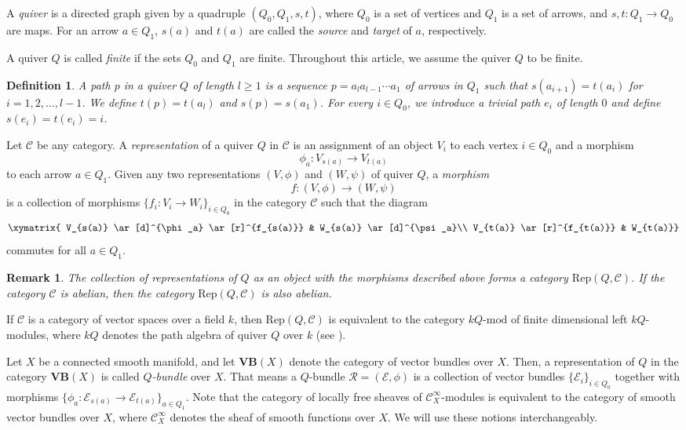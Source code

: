 \documentclass[12pt, reqno]{amsart}
\theoremstyle{plain}
\newtheorem{definition}[theorem]{Definition}
\newtheorem{remark}[theorem]{Remark}
\numberwithin{equation}{section}
\begin{document}
A \emph{quiver} is a directed graph given by a quadruple $(Q_0, Q_1, s, t)$, where $Q_0$ is a set of vertices and $Q_1$ is a set of arrows, and $s,t: Q_1\rightarrow Q_0$ are maps. For an arrow $a\in Q_1$, $s(a)$ and $t(a)$ are called the \emph{source} and \emph{target} of $a$, respectively.
	
	A quiver $Q$ is called \emph{finite} if the sets $Q_0$ and $Q_1$ are finite. Throughout this article, we assume the quiver $Q$ to be finite. 
	\begin{definition}
\rm  A \emph{path} $p$ in a quiver $Q$ of length $l \geq 1$ is a sequence $p=a_{l} a_{l-1}\cdots a_{1}$ of arrows in $Q_{1}$ such that $s(a_{i+1})=t(a_{i})$ for $i=1,2,\ldots,l-1$. We define $t(p)=t(a_{l})$ and $s(p)=s(a_{1})$. For every $i \in Q_{0}$, we introduce a trivial path $e_{i}$ of length $0$ and define $s(e_{i})=t(e_{i})=i$.
\end{definition}

	Let $\mathcal{C}$ be any category. A \emph{representation} of a quiver $Q$ in $\mathcal{C}$ is an assignment of an object $V_i$ to each vertex $i\in Q_0$ and a morphism $$\phi_a: V_{s(a)}\rightarrow V_{t(a)}$$
	to each arrow $a\in Q_1$. Given any two representations $(V,\phi)$ and $(W,\psi)$ of quiver $Q$, a \emph{morphism} 
	$$f: (V,\phi) \rightarrow (W,\psi)$$
	is a collection of morphisms $\{f_i: V_i\rightarrow W_i\}_{i\in Q_0}$ in the category $\mathcal{C}$ such that the diagram 
	\[
	\xymatrix{
		V_{s(a)} \ar[d]^{\phi_a} \ar[r]^{f_{s(a)}} & W_{s(a)} \ar[d]^{\psi_a}\\
		V_{t(a)} \ar[r]^{f_{t(a)}} & W_{t(a)}}
	\]
	commutes for all $a\in Q_1$.
	
	\begin{remark}
		\rm    The collection of representations of $Q$ as an object with the morphisms described above forms a category $\mathrm{Rep}(Q,\mathcal{C})$. If the category $\mathcal{C}$ is abelian, then the category $\mathrm{Rep}(Q,\mathcal{C})$ is also abelian.
	\end{remark}
	
	If $\mathcal{C}$ is a category of vector spaces over a field $k$, then $\mathrm{Rep}(Q, \mathcal{C})$ is equivalent to the category $kQ\text{-}\mathrm{mod}$ of finite dimensional left $kQ$-modules, where $kQ$ denotes the path algebra of quiver $Q$ over $k$ (see \cite[Proposition 1.5.4]{DW}). 
	
	Let $X$ be a connected smooth manifold, and let $\mathbf{VB}(X)$ denote the category of vector bundles over $X$. Then, a representation of $Q$ in the category $\mathbf{VB}(X)$ is called \emph{$Q$-bundle} over $X$. That means a $Q$-bundle $\mathcal{R} = (\mathcal{E}, \phi)$ is a collection of vector bundles  $\{\mathcal{E}_{i}\}_{i\in Q_0}$ together with morphisms  $\{\phi_{a}: \mathcal{E}_{s(a)}\rightarrow \mathcal{E}_{t(a)}\}_{a\in Q_1}$. Note that the category of locally free sheaves of $\mathcal{C}^{\infty}_X$-modules is equivalent to the category of smooth vector bundles over $X$, where $\mathcal{C}^{\infty}_X$ denotes the sheaf of smooth functions over $ X$. We will use these notions interchangeably.
\end{document}
